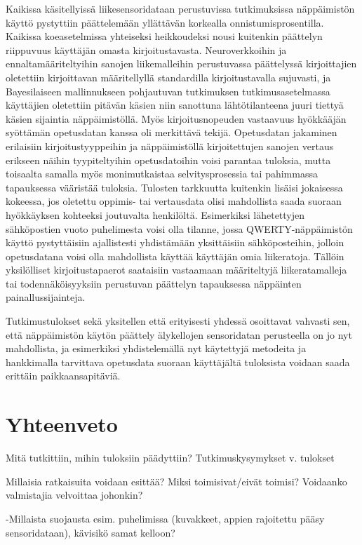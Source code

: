 \documentclass[finnish]{tktltiki2}
\theoremstyle{definition}
\theoremstyle{remark}
\begin{document}
Kaikissa käsitellyissä liikesensoridataan perustuvissa tutkimuksissa näppäimistön käyttö pystyttiin päättelemään yllättävän korkealla onnistumisprosentilla. Kaikissa koeasetelmissa yhteiseksi heikkoudeksi nousi kuitenkin päättelyn riippuvuus käyttäjän omasta kirjoitustavasta. Neuroverkkoihin ja ennaltamääriteltyihin sanojen liikemalleihin perustuvassa päättelyssä kirjoittajien oletettiin kirjoittavan määritellyllä standardilla kirjoitustavalla sujuvasti, ja  Bayesilaiseen mallinnukseen pohjautuvan tutkimuksen tutkimusasetelmassa käyttäjien oletettiin pitävän käsien niin sanottuna lähtötilanteena juuri tiettyä käsien sijaintia näppäimistöllä. Myös kirjoitusnopeuden vastaavuus hyökkääjän syöttämän opetusdatan kanssa oli merkittävä tekijä.
Opetusdatan jakaminen erilaisiin kirjoitustyyppeihin ja näppäimistöllä kirjoitettujen sanojen vertaus erikseen näihin tyypiteltyihin opetusdatoihin voisi parantaa tuloksia, mutta toisaalta samalla myös monimutkaistaa selvitysprosessia tai pahimmassa tapauksessa vääristää tuloksia. Tulosten tarkkuutta kuitenkin lisäisi jokaisessa kokeessa, jos oletettu oppimis- tai vertausdata olisi mahdollista saada suoraan hyökkäyksen kohteeksi joutuvalta henkilöltä. Esimerkiksi lähetettyjen sähköpostien vuoto puhelimesta voisi olla tilanne, jossa QWERTY-näppäimistön käyttö pystyttäisiin ajallistesti yhdistämään yksittäisiin sähköposteihin, jolloin opetusdatana voisi olla mahdollista käyttää käyttäjän omia liikeratoja. Tällöin yksilölliset kirjoitustapaerot saataisiin vastaamaan määriteltyjä liikeratamalleja tai todennäköisyyksiin perustuvan päättelyn tapauksessa näppäinten painallussijainteja.

Tutkimustulokset sekä yksitellen että erityisesti yhdessä osoittavat vahvasti sen, että näppäimistön käytön päättely älykellojen sensoridatan perusteella on jo nyt mahdollista, ja esimerkiksi yhdistelemällä nyt käytettyjä metodeita ja hankkimalla tarvittava opetusdata suoraan käyttäjältä tuloksista voidaan saada erittäin paikkaansapitäviä.

\section{Yhteenveto}

Mitä tutkittiin, mihin tuloksiin päädyttiin? Tutkimuskysymykset v. tulokset

Millaisia ratkaisuita voidaan esittää? Miksi toimisivat/eivät toimisi? Voidaanko valmistajia velvoittaa johonkin?

-Millaista suojausta esim. puhelimissa (kuvakkeet, appien rajoitettu pääsy sensoridataan), kävisikö samat kelloon?
\end{document}
